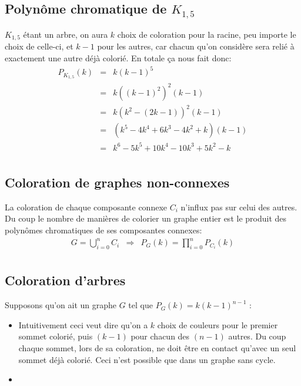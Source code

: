 \subsection{Polynôme chromatique de $K_{1,5}$}
$K_{1,5}$ étant un arbre, on aura $k$ choix de coloration pour la racine, peu importe le choix de celle-ci, et $k-1$ pour les autres, car chacun qu'on considère sera relié à exactement une autre déjà colorié. En totale ça nous fait donc:
\begin{eqnarray*}
P_{K_{1,5}}(k) 	& = & k(k-1)^5 \\
				& = & k{((k-1)^2)}^2(k-1)	\\
				& = & k(k^2 - (2k - 1))^2(k-1)	\\
				& = & (k^5 - 4k^4  + 6k^3 - 4k^2 + k)(k-1)  \\
				& = & k^6 - 5k^5  + 10k^4 - 10k^3 + 5k^2 - k	\\ 
\end{eqnarray*}

\subsection{Coloration de graphes non-connexes}
La coloration de chaque composante connexe $C_i$ n'influx pas sur celui des autres. Du coup le nombre de manières de colorier un graphe entier est le produit des polynômes chromatiques de ses composantes connexes:
\begin{eqnarray*}
G = \bigcup_{i=0}^n C_i & \Rightarrow & P_G(k)=\prod_{i=0}^n P_{C_i}(k) \\
\end{eqnarray*}

\subsection{Coloration d'arbres}
Supposons qu'on ait un graphe $G$ tel que $P_G(k) = k(k-1)^{n-1}$ :
\begin {itemize}
\item Intuitivement ceci veut dire qu'on a $k$ choix de couleurs pour le premier sommet colorié, puis $(k-1)$ pour chacun des $(n-1)$ autres. Du coup chaque sommet, lors de sa coloration, ne doit être en contact qu'avec un seul sommet déjà colorié. Ceci n'est possible que dans un graphe sans cycle. 
\item 
\end {itemize}

